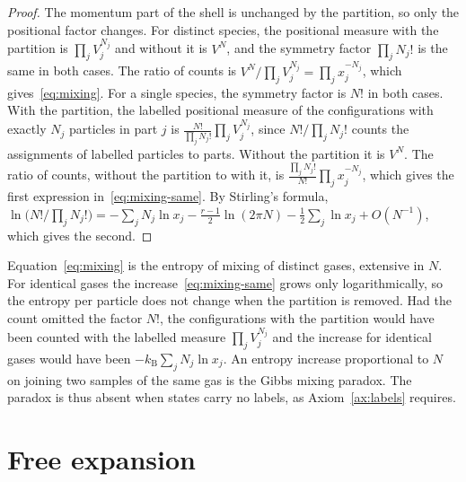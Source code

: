 \documentclass[11pt,a4paper]{article}
\theoremstyle{definition}
\theoremstyle{remark}
\newcommand{\kB}{k_{\mathrm{B}}}
\begin{document}
\begin{proof}
The momentum part of the shell is unchanged by the partition, so only the positional factor changes.
For distinct species, the positional measure with the partition is $\prod_jV_j^{N_j}$ and without it is $V^{N}$, and the symmetry factor $\prod_jN_j!$ is the same in both cases.
The ratio of counts is $V^{N}/\prod_jV_j^{N_j}=\prod_jx_j^{-N_j}$, which gives~\eqref{eq:mixing}.
For a single species, the symmetry factor is $N!$ in both cases.
With the partition, the labelled positional measure of the configurations with exactly $N_j$ particles in part $j$ is $\frac{N!}{\prod_jN_j!}\prod_jV_j^{N_j}$, since $N!/\prod_jN_j!$ counts the assignments of labelled particles to parts.
Without the partition it is $V^{N}$.
The ratio of counts, without the partition to with it, is $\frac{\prod_jN_j!}{N!}\prod_jx_j^{-N_j}$, which gives the first expression in~\eqref{eq:mixing-same}.
By Stirling's formula, $\ln\bigl(N!/\prod_jN_j!\bigr)=-\sum_jN_j\ln x_j-\tfrac{r-1}{2}\ln(2\pi N)-\tfrac12\sum_j\ln x_j+O(N^{-1})$, which gives the second.
\end{proof}

Equation~\eqref{eq:mixing} is the entropy of mixing of distinct gases, extensive in $N$.
For identical gases the increase~\eqref{eq:mixing-same} grows only logarithmically, so the entropy per particle does not change when the partition is removed.
Had the count omitted the factor $N!$, the configurations with the partition would have been counted with the labelled measure $\prod_jV_j^{N_j}$ and the increase for identical gases would have been $-\kB\sum_jN_j\ln x_j$.
An entropy increase proportional to $N$ on joining two samples of the same gas is the Gibbs mixing paradox.
The paradox is thus absent when states carry no labels, as Axiom~\ref{ax:labels} requires.

\section{Free expansion}
\label{sec:expansion}
\end{document}
